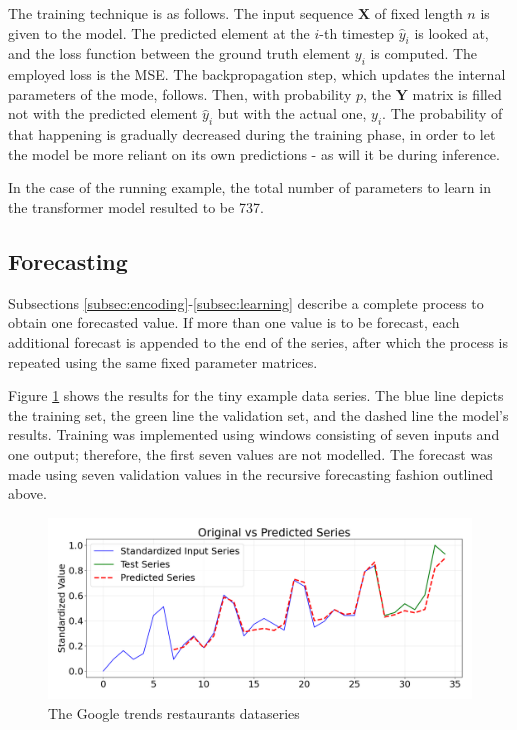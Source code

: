\documentclass[algorithms,article,submit,pdftex,moreauthors]{Definitions/mdpi}
\begin{document}
The training technique is as follows. The input sequence $\textbf{X}$ of fixed length $n$ is given to the model. The predicted element at the $i$-th timestep $\hat y_i$ is looked at, and the loss function between the ground truth element $y_i$ is computed. The employed loss is the MSE. The backpropagation step, which updates the internal parameters of the mode, follows. Then, with probability $p$, the $\textbf{Y}$ matrix is filled not with the predicted element $\hat y_i$ but with the actual one, $y_i$. The probability of that happening is gradually decreased during the training phase, in order to let the model be more reliant on its own predictions - as will it be during inference. 

In the case of the running example, the total number of parameters to learn in the transformer model resulted to be 737. 


\subsection{Forecasting} \label{subsec:forecasting}

Subsections \ref{subsec:encoding}-\ref{subsec:learning} describe a complete process to obtain one forecasted value. If more than one value is to be forecast, each additional forecast is appended to the end of the series, after which the process is repeated using the same fixed parameter matrices.

Figure \ref{fig:restaurants} shows the results for the tiny example data series. The blue line depicts the training set, the green line the validation set, and the dashed line the model's results. Training was implemented using windows consisting of seven inputs and one output; therefore, the first seven values are not modelled. The forecast was made using seven validation values in the recursive forecasting fashion outlined above.

\begin{figure}
    \centering
    \includegraphics[width=1.0\linewidth]{restaurants.png}
    \caption{The Google trends restaurants dataseries}
    \label{fig:restaurants}
\end{figure}
\end{document}
